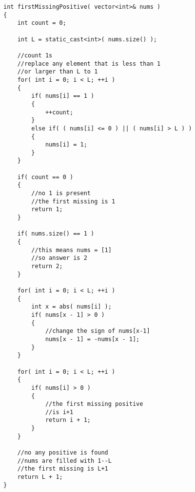 \begin{lstlisting}[style=customc, caption={Index As Hash Key}]
int firstMissingPositive( vector<int>& nums )
{
    int count = 0;

    int L = static_cast<int>( nums.size() );

    //count 1s
    //replace any element that is less than 1
    //or larger than L to 1
    for( int i = 0; i < L; ++i )
    {
        if( nums[i] == 1 )
        {
            ++count;
        }
        else if( ( nums[i] <= 0 ) || ( nums[i] > L ) )
        {
            nums[i] = 1;
        }
    }

    if( count == 0 )
    {
        //no 1 is present
        //the first missing is 1
        return 1;
    }

    if( nums.size() == 1 )
    {
        //this means nums = [1]
        //so answer is 2
        return 2;
    }

    for( int i = 0; i < L; ++i )
    {
        int x = abs( nums[i] );
        if( nums[x - 1] > 0 )
        {
            //change the sign of nums[x-1]
            nums[x - 1] = -nums[x - 1];
        }
    }

    for( int i = 0; i < L; ++i )
    {
        if( nums[i] > 0 )
        {
            //the first missing positive
            //is i+1
            return i + 1;
        }
    }

    //no any positive is found
    //nums are filled with 1--L
    //the first missing is L+1
    return L + 1;
}
\end{lstlisting}
